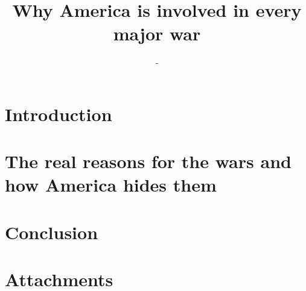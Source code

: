 \documentclass[12pt,a4paper]{article}
\title{Why America is involved in every major war}
\author{-}
\begin{document}
	
	\clearpage
	\newpage
	\tableofcontents
	\newpage
	\section{Introduction}
		
	\section{The real reasons for the wars and how America hides them}
		
		
	\section{Conclusion}
		
		
	\section{Attachments}
\end{document}
